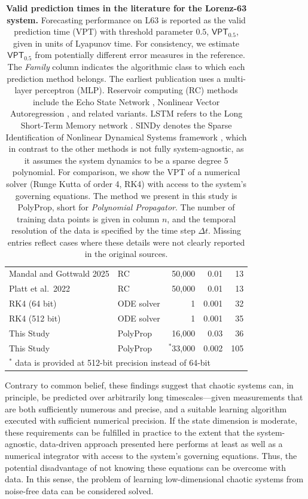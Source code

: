 \documentclass{article}
\newcommand{\stepsize}{\Delta\!t}
\newcommand{\vpt}[1]{\mathsf{VPT}_{#1}}
\begin{document}
\begin{table}
\begin{tabular}{llrrr}
		Mandal and Gottwald 2025	\citep{Mandal2025} & RC & 50{,}000 & 0.01 & 13 \\
		Platt et al.\ 2022 \citep{Platt2022} & RC & 50{,}000 & 0.01 & 13 \\
		RK4 (64 bit) & ODE solver & 1 & 0.001 & 32 \\
		RK4 (512 bit) & ODE solver & 1 & 0.001 & 35 \\
        This Study & PolyProp & 16{,}000 & 0.03 & 36 \\
		This Study & PolyProp & ${}^\ast$33{,}000 & 0.002 & 105
		 \\
		\bottomrule
    	\multicolumn{4}{l}{${}^\ast$ data is provided at 512-bit precision instead of 64-bit}
	\end{tabular}
\caption{\textbf{Valid prediction times in the literature for the Lorenz-63 system.} 
	Forecasting performance on L63 is reported as the valid prediction time (VPT) with threshold parameter $0.5$, $\vpt{0.5}$, given in units of Lyapunov time. For consistency, we estimate $\vpt{0.5}$ from potentially different error measures in the reference. The \textit{Family} column indicates the algorithmic class to which each prediction method belongs. The earliest publication uses a multi-layer perceptron (MLP). Reservoir computing (RC) methods include the Echo State Network \citep{jaeger2001echo}, Nonlinear Vector Autoregression \citep{Gauthier2021}, and related variants. LSTM refers to the Long Short-Term Memory network \citep{Hochreiter1997}. SINDy denotes the Sparse Identification of Nonlinear Dynamical Systems framework \citep{Brunton2015}, which in contrast to the other methods is not fully system-agnostic, as it assumes the system dynamics to be a sparse degree 5 polynomial. For comparison, we show the VPT of a numerical solver (Runge Kutta of order 4, RK4) with access to the system's governing equations. The method we present in this study is PolyProp, short for \textit{Polynomial Propagator}. The number of training data points is given in column $n$, and the temporal resolution of the data is specified by the time step $\stepsize$. Missing entries reflect cases where these details were not clearly reported in the original sources.}		
\label{tbl:L63:vpt:lit}
\end{table}


Contrary to common belief, these findings suggest that chaotic systems can, in principle, be predicted over arbitrarily long timescales---given measurements that are both sufficiently numerous and precise, and a suitable learning algorithm executed with sufficient numerical precision. If the state dimension is moderate, these requirements can be fulfilled in practice to the extent that the system-agnostic, data-driven approach presented here performs at least as well as a numerical integrator with access to the system's governing equations. Thus, the potential disadvantage of not knowing these equations can be overcome with data. In this sense, the problem of learning low-dimensional chaotic systems from noise-free data can be considered solved.
\end{document}
